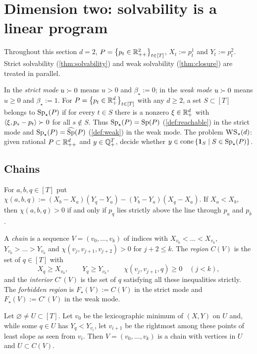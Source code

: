 \section{Dimension two: solvability is a linear program}\label{sec:planar}

Throughout this section $d=2$, $P=\set{p_t\in\Rpp}_{t\in[T]}$, $X_t:=p_t^1$ and $Y_t:=p_t^2$. Strict solvability (\cref{thm:solvability}) and weak solvability (\cref{thm:closure}) are treated in parallel.

\begin{definition}\label{def:modes}
In the \emph{strict mode} $u\gs0$ means $u>0$ and $\beta_\star:=0$; in the \emph{weak mode} $u\gs0$ means $u\ge0$ and $\beta_\star:=1$. For $P=\set{p_t\in\Rp[d]}_{t\in[T]}$ with any $d\ge2$, a set $S\subset[T]$ belongs to $\Spm(P)$ if for every $t\in S$ there is a nonzero $\xi\in\Rp[d]$ with $\ip{\xi}{p_s-p_t}\gs0$ for all $s\notin S$. Thus $\Spm(P)=\Sp(P)$ (\cref{def:reachable}) in the strict mode and $\Spm(P)=\wSp(P)$ (\cref{def:weak}) in the weak mode. The problem $\WS_\star(d)$: given rational $P\subset\Rpp[d]$ and $y\in\Q^T_+$, decide whether $y\in\cone\set{\ind S\mid S\in\Spm(P)}$.
\end{definition}

\subsection{Chains}

For $a,b,q\in[T]$ put $\chi(a,b,q):=(X_b-X_a)(Y_q-Y_a)-(Y_b-Y_a)(X_q-X_a)$. If $X_a<X_b$, then $\chi(a,b,q)>0$ if and only if $p_q$ lies strictly above the line through $p_a$ and $p_b$.

\begin{definition}[chain]\label{def:chain}
A \emph{chain} is a sequence $V=(v_0,\dots,v_k)$ of indices with $X_{v_0}<\dots<X_{v_k}$, $Y_{v_0}>\dots>Y_{v_k}$ and $\chi(v_j,v_{j+1},v_{j+2})>0$ for $j+2\le k$. The \emph{region} $C(V)$ is the set of $q\in[T]$ with
\[
X_q\ge X_{v_0},\qquad Y_q\ge Y_{v_k},\qquad \chi(v_j,v_{j+1},q)\ge0\quad(j<k),
\]
and the \emph{interior} $C^\circ(V)$ is the set of $q$ satisfying all these inequalities strictly. The \emph{forbidden region} is $F_\star(V):=C(V)$ in the strict mode and $F_\star(V):=C^\circ(V)$ in the weak mode.
\end{definition}

\begin{lemma}\label{lem:hull}
Let $\varnothing\ne U\subset[T]$. Let $v_0$ be the lexicographic minimum of $(X,Y)$ on $U$ and, while some $q\in U$ has $Y_q<Y_{v_i}$, let $v_{i+1}$ be the rightmost among these points of least slope as seen from $v_i$. Then $V=(v_0,\dots,v_k)$ is a chain with vertices in $U$ and $U\subset C(V)$.
\end{lemma}

